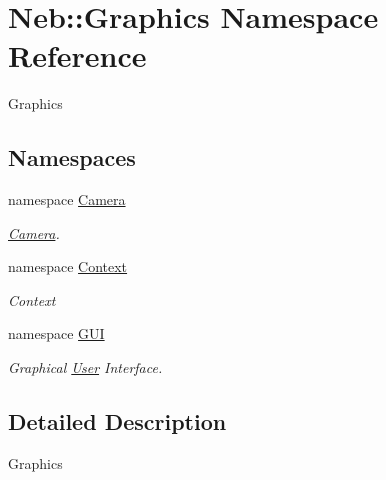 \hypertarget{namespaceNeb_1_1Graphics}{\section{\-Neb\-:\-:\-Graphics \-Namespace \-Reference}
\label{namespaceNeb_1_1Graphics}
}


\-Graphics  


\subsection*{\-Namespaces}
\begin{DoxyCompactItemize}
\item 
namespace \hyperlink{namespaceNeb_1_1Graphics_1_1Camera}{\-Camera}
\begin{DoxyCompactList}\small\item\em \hyperlink{namespaceNeb_1_1Graphics_1_1Camera}{\-Camera}. \end{DoxyCompactList}\item 
namespace \hyperlink{namespaceNeb_1_1Graphics_1_1Context}{\-Context}
\begin{DoxyCompactList}\small\item\em \-Context \end{DoxyCompactList}\item 
namespace \hyperlink{namespaceNeb_1_1Graphics_1_1GUI}{\-G\-U\-I}
\begin{DoxyCompactList}\small\item\em \-Graphical \hyperlink{classNeb_1_1User}{\-User} \-Interface. \end{DoxyCompactList}\end{DoxyCompactItemize}


\subsection{\-Detailed \-Description}
\-Graphics 